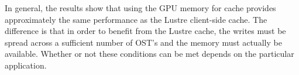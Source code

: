 In general, the results show that using the GPU memory for cache provides approximately the same performance as the Lustre client-side cache.  The difference is that in order to benefit from the Lustre cache, the writes must be spread across a sufficient number of OST's and the memory must actually be available.  Whether or not these conditions can be met depends on the particular application.  

